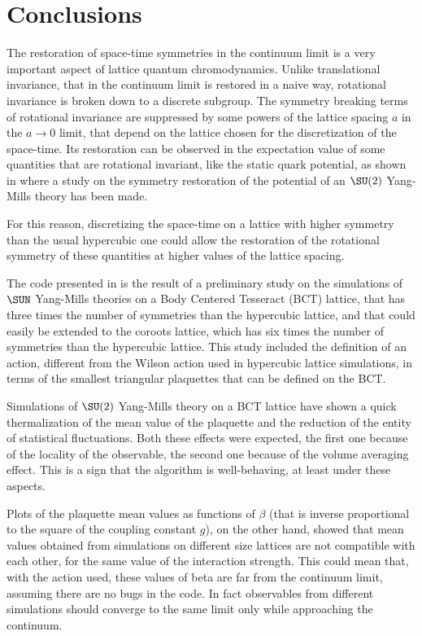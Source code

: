 \pagestyle{myFancy}
\chapter{Conclusions}

The restoration of space-time symmetries in the continuum limit is a very important aspect of lattice quantum chromodynamics.
Unlike translational invariance, that in the continuum limit is restored in a naive way, rotational invariance is broken down to a discrete subgroup.
The symmetry breaking terms of rotational invariance are suppressed by some powers of the lattice spacing $a$ in the $a\to0$ limit, that depend on the lattice chosen for the discretization of the space-time.
Its restoration can be observed in the expectation value of some quantities that are rotational invariant, like the static quark potential, as shown in  where a study on the symmetry restoration of the potential of an $\SU(2)$ Yang-Mills theory has been made.

For this reason, discretizing the space-time on a lattice with higher symmetry than the usual hypercubic one could allow the restoration of the rotational symmetry of these quantities at higher values of the lattice spacing.

The code presented in  is the result of a preliminary study on the simulations of $\SUN$ Yang-Mills theories on a Body Centered Tesseract (BCT) lattice, that has three times the number of symmetries than the hypercubic lattice, and that could easily be extended to the \spFtext coroots lattice, which has six times the number of symmetries than the hypercubic lattice.
This study included the definition of an action, different from the Wilson action used in hypercubic lattice simulations, in terms of the smallest triangular plaquettes that can be defined on the BCT.

Simulations of $\SU(2)$ Yang-Mills theory on a BCT lattice have shown a quick thermalization of the mean value of the plaquette and the reduction of the entity of statistical fluctuations.
Both these effects were expected, the first one because of the locality of the observable, the second one because of the volume averaging effect.
This is a sign that the algorithm is well-behaving, at least under these aspects.

Plots of the plaquette mean values as functions of $\beta$ (that is inverse proportional to the square of the coupling constant $g$), on the other hand, showed that mean values obtained from simulations on different size lattices are not compatible with each other, for the same value of the interaction strength.
This could mean that, with the action used, these values of beta are far from the continuum limit, assuming there are no bugs in the code.
In fact observables from different simulations should converge to the same limit only while approaching the continuum.


